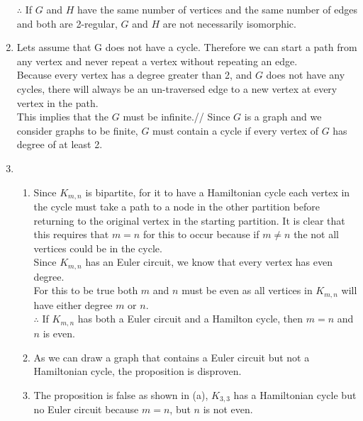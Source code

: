 \documentclass[11pt]{article}
\begin{document}
\begin{enumerate}[]
\begin{center}
		\end{center}
		$\therefore$ If $G$ and $H$ have the same number of vertices and the same number of edges and both are 2-regular, $G$ and $H$ are not necessarily isomorphic.
    \item
    	Lets assume that G does not have a cycle. Therefore we can start a path from any vertex and never repeat a vertex without repeating an edge.\\
    	Because every vertex has a degree greater than 2, and $G$ does not have any cycles, there will always be an un-traversed edge to a new vertex at every vertex in the path.\\
    	This implies that the $G$ must be infinite.//
    	Since $G$ is a graph and we consider graphs to be finite, $G$ must contain a cycle if every vertex of $G$ has degree of at least 2.
    \item
		\begin{enumerate}[label=\alph*)]
    		\item
    			Since $K_{m,n}$ is bipartite, for it to have a Hamiltonian cycle each vertex in the cycle must take a path to a node in the other partition before returning to the original vertex in the starting partition. It is clear that this requires that $m=n$ for this to occur because if $m\neq n$ the not all vertices could be in the cycle.\\
    			Since $K_{m,n}$ has an Euler circuit, we know that every vertex has even degree.\\
    			For this to be true both $m$ and $n$ must be even as all vertices in $K_{m,n}$ will have either degree $m$ or $n$.\\
    			$\therefore$ If $K_{m,n}$ has both a Euler circuit and a Hamilton cycle, then $m=n$ and $n$ is even.
    		\item
    			As we can draw a graph that contains a Euler circuit but not a Hamiltonian cycle, the proposition is disproven.\\
    			\begin {center}
				\end{center}
    		\item
    			The proposition is false as shown in (a), $K_{3,3}$ has a Hamiltonian cycle but no Euler circuit because $m=n$, but $n$ is not even.
		\end{enumerate}
\end{enumerate}
\end{document}
